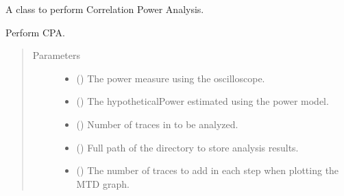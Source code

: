 \documentclass[letterpaper,10pt,english]{sphinxmanual}
\begin{document}
\begin{fulllineitems}
\label{\detokenize{reference_doc:CPA}}
A class to perform Correlation Power Analysis.

\begin{fulllineitems}
\label{\detokenize{reference_doc:CPA.doCPA}}
Perform CPA.
\begin{quote}\begin{description}
\item[{Parameters}] \leavevmode\begin{itemize}
\item {} 
 () \textendash{} The power measure using the oscilloscope.

\item {} 
 () \textendash{} The hypotheticalPower estimated using the power model.

\item {} 
 () \textendash{} Number of traces in to be analyzed.

\item {} 
 () \textendash{} Full path of the directory to store analysis results.

\item {} 
 () \textendash{} The number of traces to add in each step when plotting the MTD graph.

\end{itemize}

\end{description}\end{quote}

\end{fulllineitems}


\end{fulllineitems}
\end{document}
